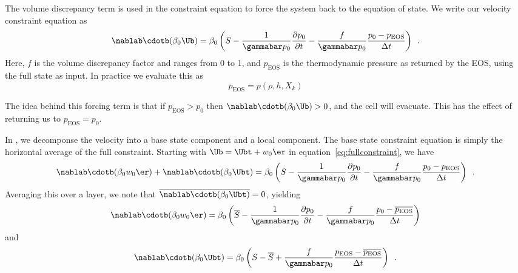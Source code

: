 \label{ch:volume}

The volume discrepancy term is used in the constraint equation to
force the system back to the equation of state.  We write our velocity
constraint equation as
\begin{equation}
\nablab \cdotb (\beta_0 \Ub)  = \beta_0 \left(S - \frac{1}{\gammabar p_0} \frac{\partial p_0}{\partial t} - \frac{f}{\gammabar p_0} \frac{p_0 - p_\mathrm{EOS}}{\Delta t} \right ) \enskip .
\label{eq:fullconstraint}
\end{equation}
Here, $f$ is the volume discrepancy factor and ranges from 0 to 1, and
$p_\mathrm{EOS}$ is the thermodynamic pressure as returned by the EOS,
using the full state as input.
In practice we evaluate this as
\begin{equation}
p_\mathrm{EOS} = p(\rho,h,X_k)
\end{equation}

The idea behind this forcing term is that if $p_\mathrm{EOS} > p_0$ then
$\nablab \cdotb (\beta_0 \Ub) > 0$, and the cell will evacuate.  This
has the effect of returning us to $p_\mathrm{EOS} = p_0$.

In \maestro, we decomponse the velocity into a base state component
and a local component.  The base state constraint equation is simply
the horizontal average of the full constraint.  Starting with 
$\Ub = \Ubt + w_0 \er$ in equation~\ref{eq:fullconstraint}, we have
\begin{equation}
\nablab \cdotb (\beta_0 w_0 \er) + \nablab \cdotb (\beta_0 \Ubt)  = \beta_0 \left(S - \frac{1}{\gammabar p_0} \frac{\partial p_0}{\partial t} - \frac{f}{\gammabar p_0} \frac{p_0 - p_\mathrm{EOS}}{\Delta t} \right ) \enskip .
\label{eq:fullconstraint2}
\end{equation}
Averaging this over a layer, we note that $\overline{\nablab \cdotb (\beta_0 \Ubt)} = 0$,
yielding
\begin{equation}
\nablab \cdotb (\beta_0 w_0 \er)  = \beta_0 \left(\overline{S} - \frac{1}{\gammabar p_0} \frac{\partial p_0}{\partial t} - \frac{f}{\gammabar p_0} \frac{p_0 - \overline{p_\mathrm{EOS}}}{\Delta t} \right ) 
\label{eq:w0constraint_vd}
\end{equation}
and
\begin{equation}
\nablab \cdotb (\beta_0 \Ubt)  = \beta_0 \left(S - \overline{S} + \frac{f}{\gammabar p_0} \frac{p_\mathrm{EOS} - \overline{p_\mathrm{EOS}}}{\Delta t} \right ) \enskip .
\label{eq:Utconstraint_vd}
\end{equation}

